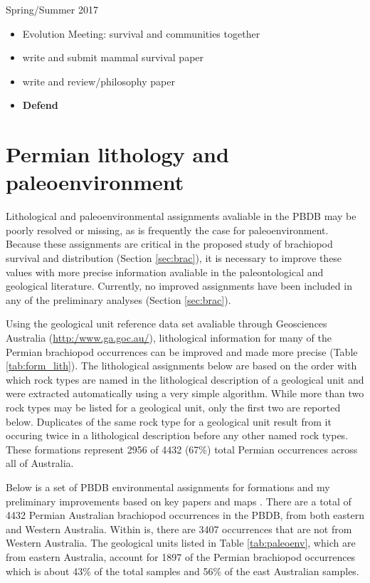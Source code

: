 \documentclass[12pt,letterpaper]{article}
\begin{document}
Spring/Summer 2017
\begin{itemize}
  \item Evolution Meeting: survival and communities together
  \item write and submit mammal survival paper
  \item write and review/philosophy paper
  \item \textbf{Defend}
\end{itemize}


\clearpage




\clearpage


\appendix

\section{Permian lithology and paleoenvironment} \label{sec:env_app}
Lithological and paleoenvironmental assignments avaliable in the PBDB may be poorly resolved or missing, as is frequently the case for paleoenvironment. Because these assignments are critical in the proposed study of brachiopod survival and distribution (Section \ref{sec:brac}), it is necessary to improve these values with more precise information avaliable in the paleontological and geological literature. Currently, no improved assignments have been included in any of the preliminary analyses (Section \ref{sec:brac}).

Using the geological unit reference data set avaliable through Geosciences Australia (\url{http:/www.ga.goc.au/}), lithological information for many of the Permian brachiopod occurrences can be improved and made more precise (Table \ref{tab:form_lith}). The lithological assignments below are based on the order with which rock types are named in the lithological description of a geological unit and were extracted automatically using a very simple algorithm. While more than two rock types may be listed for a geological unit, only the first two are reported below. Duplicates of the same rock type for a geological unit result from it occuring twice in a lithological description before any other named rock types. These formations represent 2956 of 4432 (67\%) total Permian occurrences across all of Australia.


Below is a set of PBDB environmental assignments for formations and my preliminary improvements based on key papers and maps \citep{Percival2012,Fielding2006,Hawley1995,Fielding1993,Othman2002,Othman2003}. There are a total of 4432 Permian Australian brachiopod occurrences in the PBDB, from both eastern and Western Australia. Within is, there are 3407 occurrences that are not from Western Australia. The geological units listed in Table \ref{tab:paleoenv}, which are from eastern Australia, account for 1897 of the Permian brachiopod occurrences which is about 43\% of the total samples and 56\% of the east Australian samples.

\end{document}
